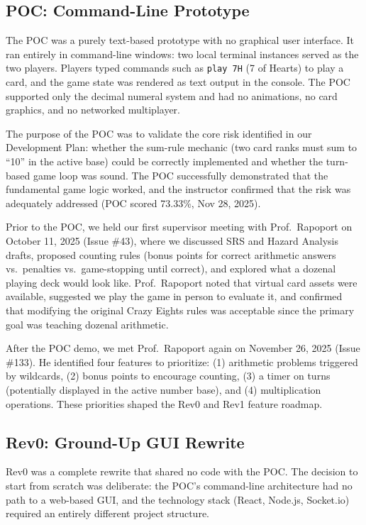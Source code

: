 \documentclass{article}
\begin{document}
\subsection{POC: Command-Line Prototype}

The POC was a purely text-based prototype with no graphical user interface. It ran entirely in command-line windows: two local terminal instances served as the two players. Players typed commands such as \texttt{play 7H} (7 of Hearts) to play a card, and the game state was rendered as text output in the console. The POC supported only the decimal numeral system and had no animations, no card graphics, and no networked multiplayer.

The purpose of the POC was to validate the core risk identified in our Development Plan: whether the sum-rule mechanic (two card ranks must sum to ``10'' in the active base) could be correctly implemented and whether the turn-based game loop was sound. The POC successfully demonstrated that the fundamental game logic worked, and the instructor confirmed that the risk was adequately addressed (POC scored 73.33\%, Nov 28, 2025).

Prior to the POC, we held our first supervisor meeting with Prof.\ Rapoport on October 11, 2025 (Issue \#43), where we discussed SRS and Hazard Analysis drafts, proposed counting rules (bonus points for correct arithmetic answers vs.\ penalties vs.\ game-stopping until correct), and explored what a dozenal playing deck would look like. Prof.\ Rapoport noted that virtual card assets were available, suggested we play the game in person to evaluate it, and confirmed that modifying the original Crazy Eights rules was acceptable since the primary goal was teaching dozenal arithmetic.

After the POC demo, we met Prof.\ Rapoport again on November 26, 2025 (Issue \#133). He identified four features to prioritize: (1) arithmetic problems triggered by wildcards, (2) bonus points to encourage counting, (3) a timer on turns (potentially displayed in the active number base), and (4) multiplication operations. These priorities shaped the Rev0 and Rev1 feature roadmap.

\subsection{Rev0: Ground-Up GUI Rewrite}

Rev0 was a complete rewrite that shared no code with the POC. The decision to start from scratch was deliberate: the POC's command-line architecture had no path to a web-based GUI, and the technology stack (React, Node.js, Socket.io) required an entirely different project structure.
\end{document}
